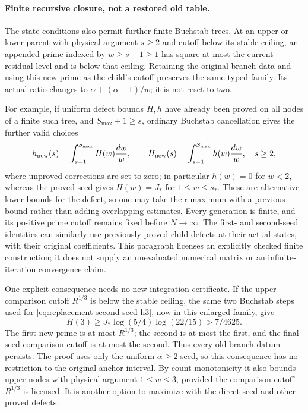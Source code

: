 \documentclass[11pt]{article}
\begin{document}
\paragraph{Finite recursive closure, not a restored old table.}
The state conditions also permit further finite Buchstab trees.
At an upper or lower parent with physical argument $s\ge2$ and
cutoff below its stable ceiling, an appended prime indexed by
$w\ge s-1\ge1$ has square at most the current residual level and
is below that ceiling.  Retaining the original branch data and
using this new prime as the child's cutoff preserves the same
typed family.  Its actual ratio changes to
$\alpha+(\alpha-1)/w$; it is not reset to two.

For example, if uniform defect bounds $H,h$ have already been proved
on all nodes of a finite such tree, and $S_{\max}+1\ge s$, ordinary
Buchstab cancellation gives the further valid choices
\[
 h_{\rm new}(s)=\int_{s-1}^{S_{\max}}H(w)\frac{dw}{w},\qquad
 H_{\rm new}(s)=\int_{s-1}^{S_{\max}}h(w)\frac{dw}{w},
 \quad s\ge2,
\]
where unproved corrections are set to zero; in particular $h(w)=0$
for $w<2$, whereas the proved seed gives $H(w)=J_*$ for
$1\le w\le s_*$.  These are alternative lower bounds for the
defect, so one may take their maximum with a previous bound rather
than adding overlapping estimates.  Every generation is finite,
and its positive prime cutoff remains fixed before $N\to\infty$.
The first- and second-seed identities can similarly use previously
proved child defects at their actual states, with their original
coefficients.  This paragraph licenses an explicitly checked finite
construction; it does not supply an unevaluated numerical matrix
or an infinite-iteration convergence claim.

One explicit consequence needs no new integration certificate.
If the upper comparison cutoff $R^{1/3}$ is below the stable ceiling,
the same two Buchstab steps used for
\eqref{eq:replacement-second-seed-h3}, now in this enlarged family,
give
\begin{equation}\label{eq:second-seed-stable-h3}
 H(3)\ge J_*\log(5/4)\log(22/15)>7/4625.
\end{equation}
The first new prime is at most $R^{1/3}$; the second is at most
the first, and the final seed comparison cutoff is at most the
second.  Thus every old branch datum persists.  The proof uses
only the uniform $\alpha\ge2$ seed, so this consequence has no
restriction to the original anchor interval.  By count monotonicity
it also bounds upper nodes with physical argument $1\le w\le3$,
provided the comparison cutoff $R^{1/3}$ is licensed.  It is another
option to maximize with the direct seed and other proved defects.
\end{document}
